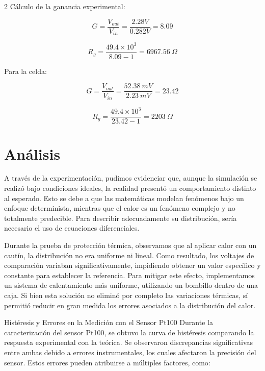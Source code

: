 \documentclass{article}
\begin{document}
\begin{multicols}{2}
Cálculo de la ganancia experimental:

\begin{equation}
G = \frac{V_{out}}{V_{in}} = \frac{2.28V}{0.282V} = 8.09
\end{equation}

\begin{equation}
R_g = \frac{49.4 \times 10^3}{8.09 - 1} = 6967.56\ \Omega
\end{equation}

Para la celda:

\begin{equation}
G = \frac{V_{out}}{V_{in}} = \frac{52.38\ mV}{2.23\ mV} = 23.42
\end{equation}

\begin{equation}
R_g = \frac{49.4 \times 10^3}{23.42 - 1} = 2203\ \Omega
\end{equation}

\section{Análisis} 

A través de la experimentación, pudimos evidenciar que, aunque la simulación se realizó bajo condiciones ideales, la realidad presentó un comportamiento distinto al esperado. Esto se debe a que las matemáticas modelan fenómenos bajo un enfoque determinista, mientras que el calor es un fenómeno complejo y no totalmente predecible. Para describir adecuadamente su distribución, sería necesario el uso de ecuaciones diferenciales.

\vspace{0.1cm}

Durante la prueba de protección térmica, observamos que al aplicar calor con un cautín, la distribución no era uniforme ni lineal. Como resultado, los voltajes de comparación variaban significativamente, impidiendo obtener un valor específico y constante para establecer la referencia. Para mitigar este efecto, implementamos un sistema de calentamiento más uniforme, utilizando un bombillo dentro de una caja. Si bien esta solución no eliminó por completo las variaciones térmicas, sí permitió reducir en gran medida los errores asociados a la distribución del calor.

\vspace{0.1cm}

Histéresis y Errores en la Medición con el Sensor Pt100
Durante la caracterización del sensor Pt100, se obtuvo la curva de histéresis comparando la respuesta experimental con la teórica. Se observaron discrepancias significativas entre ambas debido a errores instrumentales, los cuales afectaron la precisión del sensor. Estos errores pueden atribuirse a múltiples factores, como:


\end{multicols}
\end{document}
